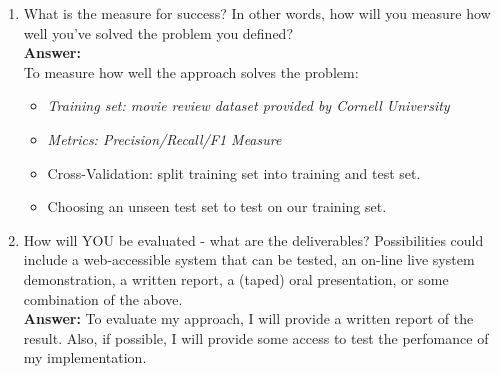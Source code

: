 \documentclass[]{article}
\begin{document}
\begin{enumerate}
\item What is the measure for success? In other words, how will you measure how well you've solved the problem you defined?
\\\textbf{Answer:}\\ 
To measure how well the approach solves the problem:
\begin{itemize}
\item \textit{Training set: movie review dataset provided by Cornell University}
\item \textit{Metrics: Precision/Recall/F1 Measure}
\item Cross-Validation: split training set into training and test set.
\item Choosing an unseen test set to test on our training set. 
\end{itemize}

\item How will YOU be evaluated - what are the deliverables? Possibilities could include a web-accessible system that can be tested, an on-line live system demonstration, a written report, a (taped) oral presentation, or some combination of the above.
\\\textbf{Answer:}
To evaluate my approach, I will provide a written report of the result. Also, if possible, I will provide some access to test the perfomance of my implementation.
\end{enumerate}
\end{document}
